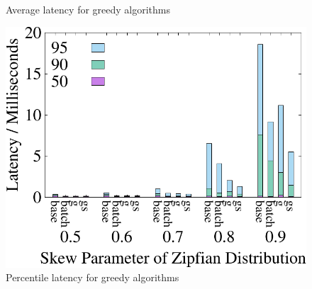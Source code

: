 \begin{figure}[t]
\begin{minipage}[b]{0.31\linewidth}
	\caption{Average latency for greedy algorithms}
	\label{fig:greedy:latency}
	\end{minipage}
    \begin{minipage}[b]{0.31\linewidth}
        \centering
        \includegraphics[width=\textwidth]{./exp_fig/greedy/percent95_latency}
        \caption{Percentile latency for greedy algorithms}
        \label{fig:greedy:p95}
    \end{minipage}
\end{figure}


